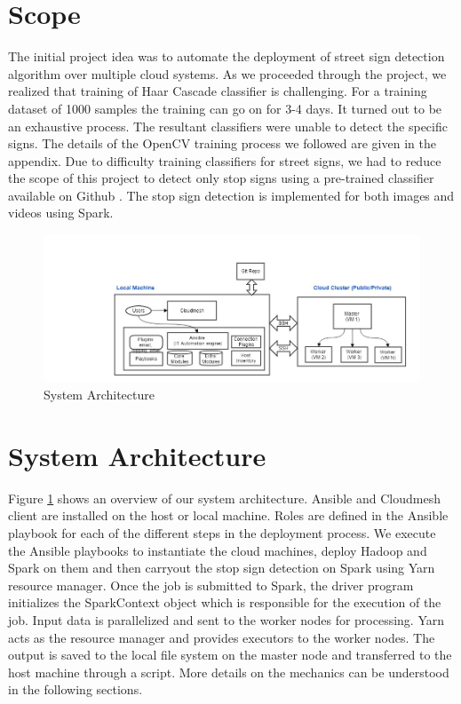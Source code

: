 \documentclass[9pt,twocolumn,twoside]{../../styles/osajnl}
\begin{document}
\section{Scope}

The initial project idea was to automate the deployment of street sign
detection algorithm over multiple cloud systems. As we proceeded
through the project, we realized that training of Haar Cascade
classifier is challenging. For a training dataset of 1000 samples the
training can go on for 3-4 days. It turned out to be an exhaustive
process. The resultant classifiers were unable to detect the specific
signs. The details of the OpenCV training process we followed are
given in the appendix. Due to difficulty training classifiers for
street signs, we had to reduce the scope of this project to detect
only stop signs using a pre-trained classifier available on Github
\cite{}. The stop sign detection is implemented for both images and
videos using Spark.


\begin{figure}[h]\centering
\includegraphics[width=\linewidth]{images/architecture}
\caption{System Architecture}
\label{fig:system}
\end{figure}

\section{System Architecture}

Figure \ref{fig:system} shows an overview of our system
architecture. Ansible and Cloudmesh client are installed on the host
or local machine. Roles are defined in the Ansible playbook for each
of the different steps in the deployment process. We execute the
Ansible playbooks to instantiate the cloud machines, deploy Hadoop and
Spark on them and then carryout the stop sign detection on Spark using
Yarn resource manager. Once the job is submitted to Spark, the driver
program initializes the SparkContext object which is responsible for
the execution of the job. Input data is parallelized and sent to the
worker nodes for processing. Yarn acts as the resource manager and
provides executors to the worker nodes. The output is saved to the
local file system on the master node and transferred to the host
machine through a script. More details on the mechanics can be
understood in the following sections.
\end{document}
